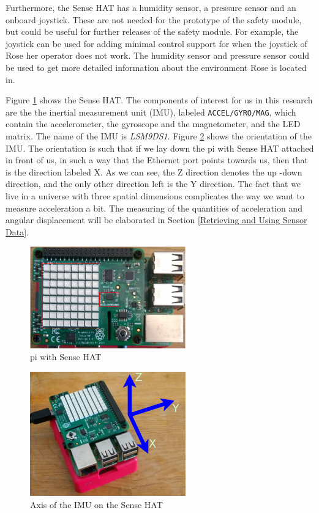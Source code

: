\documentclass[12pt]{scrreprt}
\begin{document}
Furthermore, the Sense HAT has a humidity sensor, a  pressure sensor and an onboard joystick. These are not needed for the prototype of the safety module, but could be useful for further releases of the safety module. For example, the joystick can be used for adding minimal control support for when the joystick of Rose her operator does not work. The humidity sensor and pressure sensor could be used to get more detailed information about the environment Rose is located in.
\par
Figure \ref{fig:sensehat} shows the Sense HAT. The components of interest for us in this research are the the inertial measurement unit (IMU), labeled \texttt{ACCEL/GYRO/MAG}, which contain the accelerometer, the gyroscope and the magnetometer, and the LED matrix. The name of the IMU is \textit{LSM9DS1}. Figure \ref{fig:imu_orientation} shows the orientation of the IMU. The orientation is such that if we lay down the \gls{pi} with Sense HAT attached in front of us, in such a way that the Ethernet port points towards us, then that is the direction labeled X. As we can see, the Z direction denotes the up -down direction, and the only other direction left is the Y direction. The fact that we live in a universe with three spatial dimensions complicates the way we want to measure acceleration a bit. The measuring of the quantities of acceleration and angular displacement will be elaborated in Section \ref{Retrieving and Using Sensor Data}.

\begin{figure}[H]
    \centering
    \includegraphics[width=0.6\textwidth]{Figures/results/sense_hat_self_dia.png}
    \caption{\gls{pi} with Sense HAT}
    \label{fig:sensehat}
\end{figure}

\begin{figure}[H]
    \centering
    \includegraphics[width=0.6\textwidth]{Figures/results/pi_not_above.png}
    \caption{Axis of the IMU on the Sense HAT}
    \label{fig:imu_orientation}
\end{figure}
\end{document}
